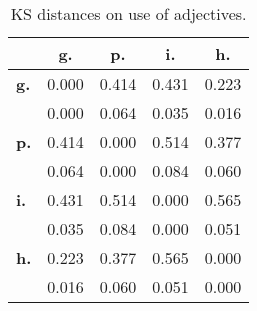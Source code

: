 \begin{table}[h!]
\begin{center}
\begin{tabular}{| l || c | c | c | c |}\hline
 & {\bf g.} & {\bf p.} & {\bf i.} & {\bf h.} \\\hline\hline
{\bf g.} & 0.000 & 0.414 & 0.431 & 0.223 \\
{\bf } & 0.000 & 0.064 & 0.035 & 0.016 \\\hline
{\bf p.} & 0.414 & 0.000 & 0.514 & 0.377 \\
{\bf } & 0.064 & 0.000 & 0.084 & 0.060 \\\hline
{\bf i.} & 0.431 & 0.514 & 0.000 & 0.565 \\
{\bf } & 0.035 & 0.084 & 0.000 & 0.051 \\\hline
{\bf h.} & 0.223 & 0.377 & 0.565 & 0.000 \\
{\bf } & 0.016 & 0.060 & 0.051 & 0.000 \\\hline
\end{tabular}
\caption{KS distances on use of adjectives.}
\end{center}
\end{table}